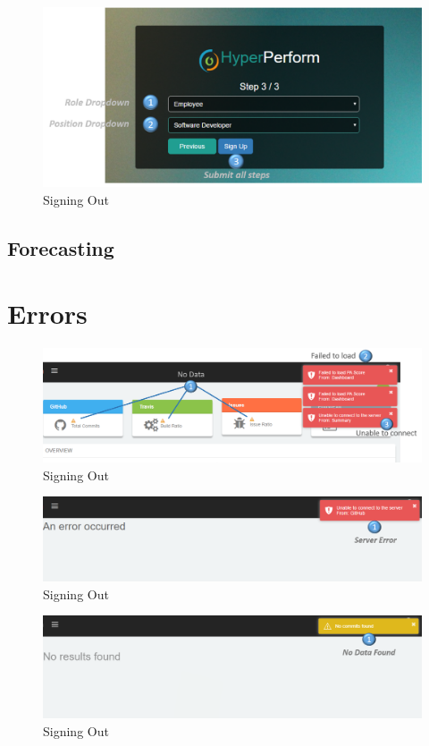 \documentclass[11pt,a4paper]{article}
\begin{document}
\begin{figure}[H]
	\begin{center}
		\includegraphics[width=\linewidth]{../Images/Getting_Started/Step_3_numbered}
		\caption{Signing Out}
	\end{center}
\end{figure}

\subsection{Forecasting}

\section{Errors}
\begin{figure}[H]
	\begin{center}
		\includegraphics[width=\linewidth]{../Images/Getting_Started/Dash_Error_numbered}
		\caption{Signing Out}
	\end{center}
\end{figure}

\begin{figure}[H]
	\begin{center}
		\includegraphics[width=\linewidth]{../Images/Getting_Started/Connect_Server_Detailed_numbered}
		\caption{Signing Out}
	\end{center}
\end{figure}

\begin{figure}[H]
	\begin{center}
		\includegraphics[width=\linewidth]{../Images/Getting_Started/No_Data_Detailed_numbered}
		\caption{Signing Out}
	\end{center}
\end{figure}
\end{document}
